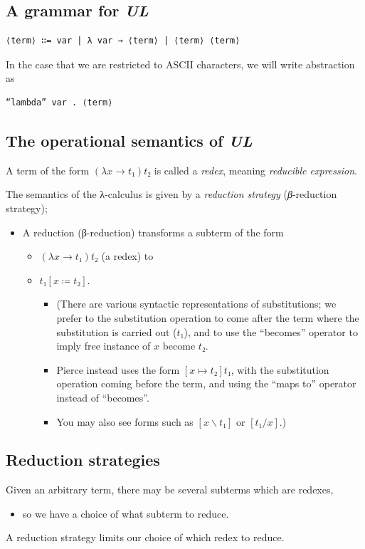 \documentclass[11pt]{article}
\theoremstyle{definition}
\begin{document}
\subsection{A grammar for \emph{UL}}
\label{sec:orgb559362}
\begin{verbatim}
⟨term⟩ ∷= var | λ var → ⟨term⟩ | ⟨term⟩ ⟨term⟩
\end{verbatim}

In the case that we are restricted to ASCII characters,
we will write abstraction as
\begin{verbatim}
“lambda” var . ⟨term⟩
\end{verbatim}

\subsection{The operational semantics of \emph{UL}}
\label{sec:org9b0366b}
A term of the form \((λ x → t₁) t₂\) is called a \emph{redex},
meaning \emph{reducible expression}.

The semantics of the λ-calculus is given by a \emph{reduction strategy}
(\emph{β}-reduction strategy);
\begin{itemize}
\item A reduction (β-reduction) transforms a subterm of the form
\begin{itemize}
\item \((λ x → t₁) t₂\) (a redex) to
\item \(t₁[x ≔ t₂]\).
\begin{itemize}
\item (There are various syntactic representations of substitutions;
we prefer to the substitution operation to come after the term
where the substitution is carried out (\(t₁\)), and to use
the “becomes” operator to imply free instance of \(x\) become \(t₂\).
\item Pierce instead uses the form \([x ↦ t₂]t₁\), with the
substitution operation coming before the term,
and using the “maps to” operator instead of “becomes”.
\item You may also see forms such as \([x\backslash t₁]\) or \([t₁/x]\).)
\end{itemize}
\end{itemize}
\end{itemize}

\subsection{Reduction strategies}
\label{sec:org4569db3}
Given an arbitrary term, there may be several subterms which are redexes,
\begin{itemize}
\item so we have a choice of what subterm to reduce.
\end{itemize}
A reduction strategy limits our choice of which redex to reduce.
\end{document}
